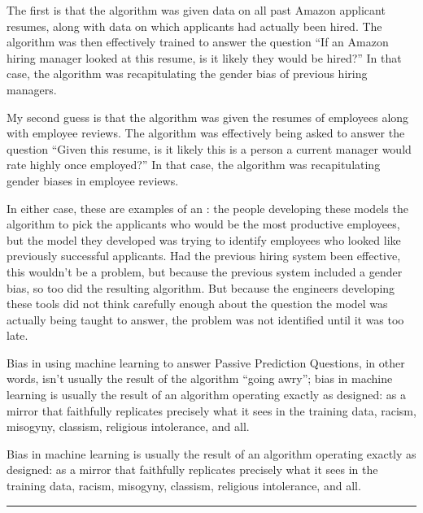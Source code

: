 \documentclass[letterpaper,10pt,english]{jupyterBook}
\begin{document}
\sphinxAtStartPar
The first is that the algorithm was given data on all past Amazon applicant resumes, along with data on which applicants had actually been hired. The algorithm was then effectively trained to answer the question “If an Amazon hiring manager looked at this resume, is it likely they would be hired?” In that case, the algorithm was recapitulating the gender bias of previous hiring managers.

\sphinxAtStartPar
My second guess is that the algorithm was given the resumes of  employees along with employee reviews. The algorithm was effectively being asked to answer the question “Given this resume, is it likely this is a person a current manager would rate highly once employed?” In that case, the algorithm was recapitulating gender biases in employee reviews.

\sphinxAtStartPar
In either case, these are examples of an : the people developing these models  the algorithm to pick the applicants who would be the most productive employees, but the model they  developed was trying to identify employees who looked like previously successful applicants. Had the previous hiring system been effective, this wouldn’t be a problem, but because the previous system included a gender bias, so too did the resulting algorithm. But because the engineers developing these tools did not think carefully enough about the question the model was actually being taught to answer, the problem was not identified until it was too late.

\sphinxAtStartPar
Bias in using machine learning to answer Passive Prediction Questions, in other words, isn’t usually the result of the algorithm “going awry”; bias in machine learning is usually the result of an algorithm operating exactly as designed: as a mirror that faithfully replicates precisely what it sees in the training data, racism, misogyny, classism, religious intolerance, and all.

\begin{sphinxShadowBox}

\sphinxAtStartPar
Bias in machine learning is usually the result of an algorithm operating exactly as designed: as a mirror that faithfully replicates precisely what it sees in the training data, racism, misogyny, classism, religious intolerance, and all.
\end{sphinxShadowBox}


\bigskip\hrule\bigskip
\end{document}
